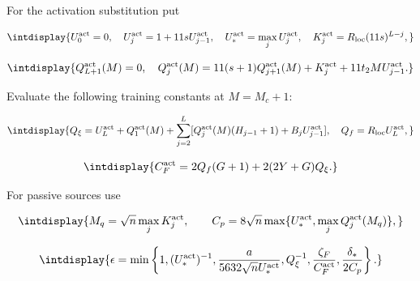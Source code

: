 
For the activation substitution put


\begingroup\renewcommand{\theHequation}{intdisplay.267}
\begin{equation*}
\intdisplay{
U_0^{\rm act}=0,\quad U_j^{\rm act}=1+11sU_{j-1}^{\rm act},\quad
U_*^{\rm act}=\max_jU_j^{\rm act},\quad
K_j^{\rm act}=R_{\rm loc}(11s)^{L-j},
}
\end{equation*}
\endgroup

\begingroup\renewcommand{\theHequation}{intdisplay.268}
\begin{equation*}
\intdisplay{
Q_{L+1}^{\rm act}(M)=0,\quad
Q_j^{\rm act}(M)=11(s+1)Q_{j+1}^{\rm act}(M)
                   +K_j^{\rm act}+11t_2M U_{j-1}^{\rm act}.
}
\end{equation*}
\endgroup


Evaluate the following training constants at \(M=M_c+1\):


\begingroup\renewcommand{\theHequation}{intdisplay.269}
\begin{equation*}
\intdisplay{
Q_\xi=U_L^{\rm act}+Q_1^{\rm act}(M)
 +\sum_{j=2}^L[Q_j^{\rm act}(M)(H_{j-1}+1)+B_jU_{j-1}^{\rm act}],
\quad Q_f=R_{\rm loc}U_L^{\rm act},
}
\end{equation*}
\endgroup

\begingroup\renewcommand{\theHequation}{intdisplay.270}
\begin{equation*}
\intdisplay{
C_F^{\rm act}=2Q_f(G+1)+2(2Y+G)Q_\xi.
}
\end{equation*}
\endgroup


For passive sources use


\begingroup\renewcommand{\theHequation}{intdisplay.271}
\begin{equation*}
\intdisplay{
M_q=\sqrt n\max_jK_j^{\rm act},\qquad
C_p=8\sqrt n\max\{U_*^{\rm act},\max_jQ_j^{\rm act}(M_q)\},
}
\end{equation*}
\endgroup

\begingroup\renewcommand{\theHequation}{intdisplay.272}
\begin{equation*}
\intdisplay{
\epsilon=\min\left\{
1,(U_*^{\rm act})^{-1},
\frac{a}{5632\sqrt nU_*^{\rm act}},
Q_\xi^{-1},\frac{\zeta_F}{C_F^{\rm act}},\frac{\delta_*}{2C_p}\right\}.
}
\end{equation*}
\endgroup

